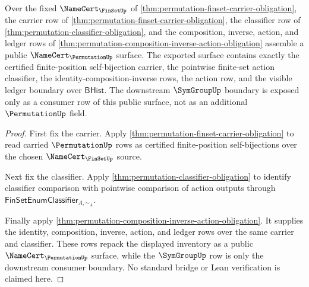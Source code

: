 \begin{theorem}\label{thm:permutation-public-namecert-surface}
Over the fixed $\NameCert_{\FinSetUp}$ of \autoref{thm:permutation-finset-carrier-obligation}, the carrier row of \autoref{thm:permutation-finset-carrier-obligation}, the classifier row of \autoref{thm:permutation-classifier-obligation}, and the composition, inverse, action, and ledger rows of \autoref{thm:permutation-composition-inverse-action-obligation} assemble a public $\NameCert_{\PermutationUp}$ surface. The exported surface contains exactly the certified finite-position self-bijection carrier, the pointwise finite-set action classifier, the identity-composition-inverse rows, the action row, and the visible ledger boundary over $\mathsf{BHist}$. The downstream $\SymGroupUp$ boundary is exposed only as a consumer row of this public surface, not as an additional $\PermutationUp$ field.
\end{theorem}
\begin{proof}
First fix the carrier. Apply \autoref{thm:permutation-finset-carrier-obligation} to read carried $\PermutationUp$ rows as certified finite-position self-bijections over the chosen $\NameCert_{\FinSetUp}$ source.

Next fix the classifier. Apply \autoref{thm:permutation-classifier-obligation} to identify classifier comparison with pointwise comparison of action outputs through $\mathsf{FinSetEnumClassifier}_{A,\sim_A}$.

Finally apply \autoref{thm:permutation-composition-inverse-action-obligation}. It supplies the identity, composition, inverse, action, and ledger rows over the same carrier and classifier. These rows repack the displayed inventory as a public $\NameCert_{\PermutationUp}$ surface, while the $\SymGroupUp$ row is only the downstream consumer boundary. No standard bridge or Lean verification is claimed here.
\end{proof}

